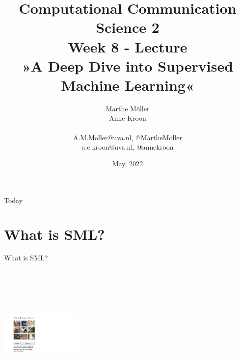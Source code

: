\documentclass[handout]{beamer}
\title[Computational Communication Science 2]{\textbf{Computational Communication Science 2} \\Week 8 - Lecture\\ »A Deep Dive into Supervised Machine Learning«}
\author[Marthe Möller, Anne Kroon]{Marthe Möller \\ Anne Kroon \\ ~ \\ \footnotesize{A.M.Moller@uva.nl, @MartheMoller \\a.c.kroon@uva.nl, @annekroon} \\}
\date{May, 2022}
\institute[Digital Society Minor, University of Amsterdam]{Digital Society Minor, University of Amsterdam}
\begin{document}
	
	\begin{frame}{}
		\titlepage
\end{frame}
	
\begin{frame}{Today}
		\tableofcontents
\end{frame}


\section{What is SML?}


\begin{frame}{What is SML?}
	
	\begin{center}
		\includegraphics[width=4cm, height=7cm]{../pictures/CAPTCHA.png} \\\
	\end{center}
	
	
	
\end{frame}
\end{document}
